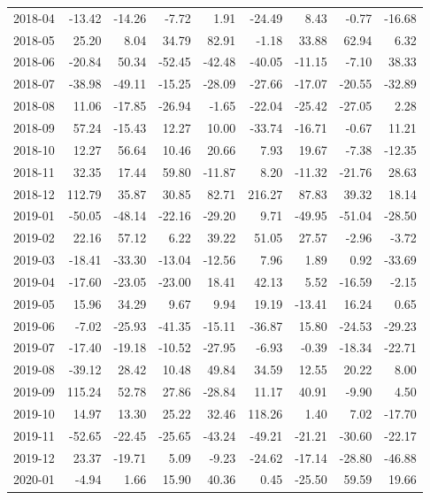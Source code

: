 \begin{table}[ht]
\begin{tabular}{lrrrrrrrr}
  2018-04 & -13.42 & -14.26 & -7.72 & 1.91 & -24.49 & 8.43 & -0.77 & -16.68 \\ 
  2018-05 & 25.20 & 8.04 & 34.79 & 82.91 & -1.18 & 33.88 & 62.94 & 6.32 \\ 
  2018-06 & -20.84 & 50.34 & -52.45 & -42.48 & -40.05 & -11.15 & -7.10 & 38.33 \\ 
  2018-07 & -38.98 & -49.11 & -15.25 & -28.09 & -27.66 & -17.07 & -20.55 & -32.89 \\ 
  2018-08 & 11.06 & -17.85 & -26.94 & -1.65 & -22.04 & -25.42 & -27.05 & 2.28 \\ 
  2018-09 & 57.24 & -15.43 & 12.27 & 10.00 & -33.74 & -16.71 & -0.67 & 11.21 \\ 
  2018-10 & 12.27 & 56.64 & 10.46 & 20.66 & 7.93 & 19.67 & -7.38 & -12.35 \\ 
  2018-11 & 32.35 & 17.44 & 59.80 & -11.87 & 8.20 & -11.32 & -21.76 & 28.63 \\ 
  2018-12 & 112.79 & 35.87 & 30.85 & 82.71 & 216.27 & 87.83 & 39.32 & 18.14 \\ 
  2019-01 & -50.05 & -48.14 & -22.16 & -29.20 & 9.71 & -49.95 & -51.04 & -28.50 \\ 
  2019-02 & 22.16 & 57.12 & 6.22 & 39.22 & 51.05 & 27.57 & -2.96 & -3.72 \\ 
  2019-03 & -18.41 & -33.30 & -13.04 & -12.56 & 7.96 & 1.89 & 0.92 & -33.69 \\ 
  2019-04 & -17.60 & -23.05 & -23.00 & 18.41 & 42.13 & 5.52 & -16.59 & -2.15 \\ 
  2019-05 & 15.96 & 34.29 & 9.67 & 9.94 & 19.19 & -13.41 & 16.24 & 0.65 \\ 
  2019-06 & -7.02 & -25.93 & -41.35 & -15.11 & -36.87 & 15.80 & -24.53 & -29.23 \\ 
  2019-07 & -17.40 & -19.18 & -10.52 & -27.95 & -6.93 & -0.39 & -18.34 & -22.71 \\ 
  2019-08 & -39.12 & 28.42 & 10.48 & 49.84 & 34.59 & 12.55 & 20.22 & 8.00 \\ 
  2019-09 & 115.24 & 52.78 & 27.86 & -28.84 & 11.17 & 40.91 & -9.90 & 4.50 \\ 
  2019-10 & 14.97 & 13.30 & 25.22 & 32.46 & 118.26 & 1.40 & 7.02 & -17.70 \\ 
  2019-11 & -52.65 & -22.45 & -25.65 & -43.24 & -49.21 & -21.21 & -30.60 & -22.17 \\ 
  2019-12 & 23.37 & -19.71 & 5.09 & -9.23 & -24.62 & -17.14 & -28.80 & -46.88 \\ 
  2020-01 & -4.94 & 1.66 & 15.90 & 40.36 & 0.45 & -25.50 & 59.59 & 19.66 \\ 

\end{tabular}
\end{table}
